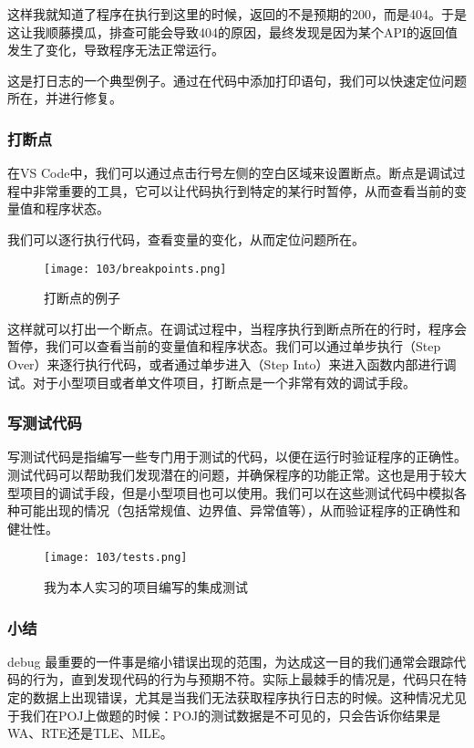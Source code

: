 这样我就知道了程序在执行到这里的时候，返回的不是预期的200，而是404。于是这让我顺藤摸瓜，排查可能会导致404的原因，最终发现是因为某个API的返回值发生了变化，导致程序无法正常运行。

这是打日志的一个典型例子。通过在代码中添加打印语句，我们可以快速定位问题所在，并进行修复。

\subsubsection{打断点}

在VS Code中，我们可以通过点击行号左侧的空白区域来设置断点。断点是调试过程中非常重要的工具，它可以让代码执行到特定的某行时暂停，从而查看当前的变量值和程序状态。

我们可以逐行执行代码，查看变量的变化，从而定位问题所在。

\begin{figure}[ht]
  \centering
  \texttt{[image: 103/breakpoints.png]}
  \caption{打断点的例子}
\end{figure}

这样就可以打出一个断点。在调试过程中，当程序执行到断点所在的行时，程序会暂停，我们可以查看当前的变量值和程序状态。我们可以通过单步执行（Step Over）来逐行执行代码，或者通过单步进入（Step Into）来进入函数内部进行调试。对于小型项目或者单文件项目，打断点是一个非常有效的调试手段。

\subsubsection{写测试代码}

写测试代码是指编写一些专门用于测试的代码，以便在运行时验证程序的正确性。测试代码可以帮助我们发现潜在的问题，并确保程序的功能正常。这也是用于较大型项目的调试手段，但是小型项目也可以使用。我们可以在这些测试代码中模拟各种可能出现的情况（包括常规值、边界值、异常值等），从而验证程序的正确性和健壮性。

\begin{figure}[ht]
  \centering
  \texttt{[image: 103/tests.png]}
  \caption{我为本人实习的项目编写的集成测试}
\end{figure}

\subsubsection{小结}

debug 最重要的一件事是缩小错误出现的范围，为达成这一目的我们通常会跟踪代码的行为，直到发现代码的行为与预期不符。实际上最棘手的情况是，代码只在特定的数据上出现错误，尤其是当我们无法获取程序执行日志的时候。这种情况尤见于我们在POJ上做题的时候：POJ的测试数据是不可见的，只会告诉你结果是WA、RTE还是TLE、MLE。

